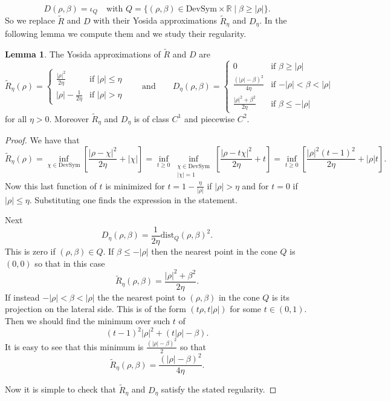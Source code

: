 \documentclass[a4paper,10pt,twoside]{amsbook}
\numberwithin{section}{chapter}
\numberwithin{equation}{chapter}
\theoremstyle{definition}
\newtheorem{lemma}[prop]{Lemma}
\begin{document}
\[
D(\rho,\beta)=\iota_Q\quad\text{with $Q=\{(\rho,\beta)\in\text{DevSym}\times\mathbb{R}\;|\;\beta\ge|\rho|\}$}.
\]
So we replace $\tilde R$ and $D$ with their Yosida approximations $\tilde R_\eta$ and $D_\eta$. In the following lemma we compute them and we study their regularity.
\begin{lemma}
The Yosida approximations of $\tilde R$ and $D$ are
\[
\tilde R_\eta(\rho)
=\begin{cases}
\frac{|\rho|^2}{2\eta} & \text{if $|\rho|\le\eta$} \\
|\rho|-\frac{1}{2\eta} & \text{if $|\rho|>\eta$}
\end{cases}
\qquad\text{and}\qquad
D_\eta(\rho,\beta)
=\begin{cases}
0 & \text{if $\beta\ge|\rho|$} \\
\frac{(|\rho|-\beta)^2}{4\eta} & \text{if $-|\rho|<\beta<|\rho|$} \\
\frac{|\rho|^2+\beta^2}{2\eta} & \text{if $\beta\le-|\rho|$}
\end{cases}
\]
for all $\eta>0$. Moreover $\tilde R_\eta$ and $D_\eta$ is of class $C^1$ and piecewise $C^2$.
\end{lemma}
\begin{proof}
We have that
\[
\tilde R_\eta(\rho)=\inf_{\chi\in\text{DevSym}}\left[\frac{|\rho-\chi|^2}{2\eta}+|\chi|\right]=\inf_{t\ge0}\inf_{\substack{\chi\in\text{DevSym}\\|\chi|=1}}
\left[\frac{|\rho-t\chi|^2}{2\eta}+t\right]=\inf_{t\ge0}\left[\frac{|\rho|^2(t-1)^2}{2\eta}+|\rho|t\right].
\]
Now this last function of $t$ is minimized for $t=1-\frac{\eta}{|\rho|}$ if $|\rho|>\eta$ and for $t=0$ if $|\rho|\le\eta$. Substituting one finds the expression in the statement.

Next
\[
D_\eta(\rho,\beta)=\frac{1}{2\eta}\text{dist}_Q(\rho,\beta)^2.
\]
This is zero if $(\rho,\beta)\in Q$. If $\beta\le-|\rho|$ then the nearest point in the cone $Q$ is $(0,0)$ so that in this case
\[
\tilde R_\eta(\rho,\beta)=\frac{|\rho|^2+\beta^2}{2\eta}.
\]
If instead $-|\rho|<\beta<|\rho|$ the the nearest point to $(\rho,\beta)$ in the cone $Q$ is its projection on the lateral side. This is of the form $(t\rho,t|\rho|)$ for some $t\in(0,1)$. Then we should find the minimum over such $t$ of
\[
(t-1)^2|\rho|^2+(t|\rho|-\beta).
\]
It is easy to see that this minimum is $\frac{(|\rho|-\beta)^2}{2}$ so that
\[
\tilde R_\eta(\rho,\beta)=\frac{(|\rho|-\beta)^2}{4\eta}.
\]

Now it is simple to check that $\tilde R_\eta$ and $D_\eta$ satisfy the stated regularity.
\end{proof}
\end{document}
